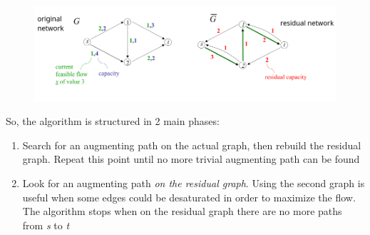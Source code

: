 \begin{itemize}
                        \begin{figure}[H]
                            \centering
                            \includegraphics[width = \textwidth]{./images/Residual.png}
                        \end{figure}
                \end{itemize}
                So, the algorithm is structured in 2 main phases:
                \begin{enumerate}
                    \item Search for an augmenting path on the actual graph, then rebuild the residual graph. Repeat this point until no more trivial augmenting path can be found
                    \item Look for an augmenting path \textit{on the residual graph}. Using the second graph is useful when some edges could be desaturated in order to maximize the flow. The algorithm stops when on the residual graph there are no more paths from \emph{s} to \emph{t}
                \end{enumerate}